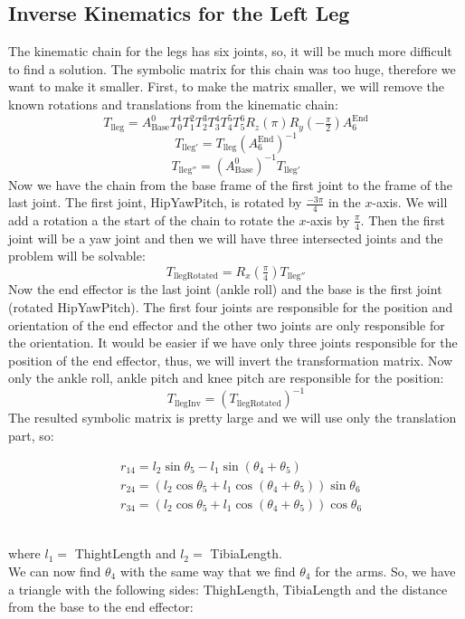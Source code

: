 \subsection{Inverse Kinematics for the Left Leg}
The kinematic chain for the legs has six joints, so, it will be much more difficult to find a solution. The symbolic matrix for this chain was too huge, therefore we want to make it smaller. First, to make the matrix smaller, we will remove the known rotations and translations from the kinematic chain:
\[
T_{\text{lleg}} = A^0_\text{Base}T^1_0T^2_1T^3_2T^4_3T^5_4T^6_5R_z(\pi)R_y(-\tfrac{\pi}{2})A^\text{End}_6
\]
\[
T_{\text{lleg}'} = T_\text{lleg}{\left(A^\text{End}_6\right)}^{-1}
\]
\[
T_{\text{lleg}''} = {\left(A^0_\text{Base}\right)}^{-1}T_{\text{lleg}'}
\]
Now we have the chain from the base frame of the first joint to the frame of the last joint. The first joint, HipYawPitch, is rotated by $ \frac{-3\pi}{4} $ in the $ x $-axis. We will add a rotation a the start of the chain to rotate the $x$-axis by $\frac{\pi}{4}$. Then the first joint will be a yaw joint and then we will have three intersected joints and the problem will be solvable:
\[
T_\text{llegRotated} = R_x(\tfrac{\pi}{4})T_{\text{lleg}''}
\]
Now the end effector is the last joint (ankle roll) and the base is the first joint (rotated HipYawPitch). The first four joints are responsible for the position and orientation of the end effector and the other two joints are only responsible for the orientation. It would be easier if we have only three joints responsible for the position of the end effector, thus, we will invert the transformation matrix. Now only the ankle roll, ankle pitch and knee pitch are responsible for the position:
\[
T_\text{llegInv} = {\left(T_\text{llegRotated}\right)}^{-1}
\]
The resulted symbolic matrix is pretty large and we will use only the translation part, so:
\begin{small}
\begin{align*}
&r_{14} = l_2\sin\theta_5 - l_1\sin\left(\theta_4 + \theta_5\right)\\
&r_{24} = \left(l_2\cos\theta_5 + l_1 \cos\left(\theta_4 + \theta_5\right)\right)\sin\theta_6\\
&r_{34} = \left(l_2\cos\theta_5 + l_1 \cos\left(\theta_4 + \theta_5\right)\right)\cos\theta_6
\end{align*}
\end{small}\\
where $l_1 =$ ThightLength and $l_2 =$ TibiaLength.\\
We can now find $\theta_4$ with the same way that we find $\theta_4$ for the arms. So, we have a triangle with the following sides: ThighLength, TibiaLength and the distance from the base to the end effector:

